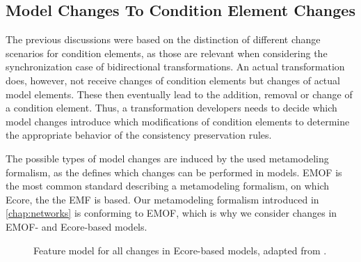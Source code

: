 

\subsection{Model Changes To Condition Element Changes}

The previous discussions were based on the distinction of different change scenarios for condition elements, as those are relevant when considering the synchronization case of bidirectional transformations.
An actual transformation does, however, not receive changes of condition elements but changes of actual model elements.
These then eventually lead to the addition, removal or change of a condition element.
Thus, a transformation developers needs to decide which model changes introduce which modifications of condition elements to determine the appropriate behavior of the consistency preservation rules.

The possible types of model changes are induced by the used metamodeling formalism, as the \metametamodel defines which changes can be performed in models.
\gls{EMOF} is the most common standard describing a metamodeling formalism, on which Ecore, the \metametamodel the \gls{EMF} is based.
Our metamodeling formalism introduced in \autoref{chap:networks} is conforming to \gls{EMOF}, which is why we consider changes in \gls{EMOF}- and Ecore-based models.


\begin{figure}
    \centering
    
    \caption[Feature model for changes in Ecore-based models]{Feature model for all changes in Ecore-based models, adapted from \cite[Fig. 5.3]{kramer2017a}.}
    \label{fig:synchronization:change_feature_model}
\end{figure}

